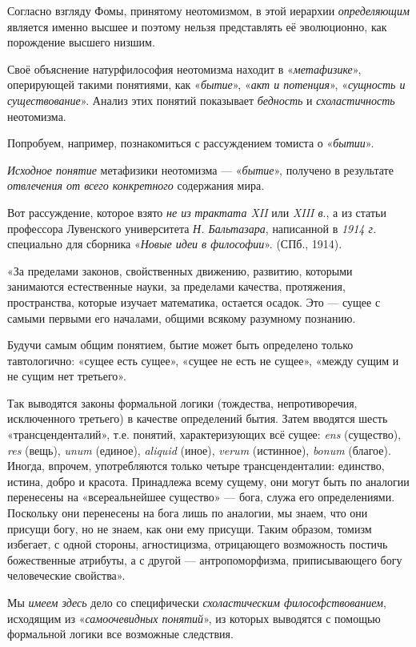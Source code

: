 \documentclass[a4paper,14pt,russian]{extreport}
\begin{document}
Согласно взгляду Фомы, принятому неотомизмом, в этой иерархии \emph{определяющим} является именно высшее и поэтому нельзя представлять её эволюционно, как порождение высшего низшим.

Своё объяснение натурфилософия неотомизма находит в «\emph{метафизике}», оперирующей такими понятиями, как «\emph{бытие}», «\emph{акт и потенция}», «\emph{сущность и существование}». Анализ этих понятий показывает \emph{бедность} и \emph{схоластичность} неотомизма.

Попробуем, например, познакомиться с рассуждением томиста о «\emph{бытии}».

\emph{Исходное понятие} метафизики неотомизма --- «\emph{бытие}», получено в результате \emph{отвлечения от всего конкретного} содержания мира.

Вот рассуждение, которое взято \emph{не из} \emph{трактата XII} или \emph{XIII в}., а из статьи профессора Лувенского университета \emph{Н. Бальтазара}, написанной в \emph{1914 г.} специально для сборника «\emph{Новые идеи в философии}». (СПб., 1914).

«За пределами законов, свойственных движению, развитию, которыми занимаются естественные науки, за пределами качества, протяжения, пространства, которые изучает математика, остается осадок. Это --- сущее с самыми первыми его началами, общими всякому разумному познанию.

Будучи самым общим понятием, бытие может быть определено только тавтологично: «сущее есть сущее», «сущее не есть не сущее», «между сущим и не сущим нет третьего».

Так выводятся законы формальной логики (тождества, непротиворечия, исключенного третьего) в качестве определений бытия. Затем вводятся шесть «трансценденталий», т.е. понятий, характеризующих всё сущее: \emph{ens} (существо), \emph{res} (вещь), \emph{unum} (единое), \emph{aliquid} (иное), \emph{verum} (истинное), \emph{bonum} (благое). Иногда, впрочем, употребляются только четыре трансценденталии: единство, истина, добро и красота. Принадлежа всему сущему, они могут быть по аналогии перенесены на «всереальнейшее существо» --- бога, служа его определениями. Поскольку они перенесены на бога лишь по аналогии, мы знаем, что они присущи богу, но не знаем, как они ему присущи. Таким образом, томизм избегает, с одной стороны, агностицизма, отрицающего возможность постичь божественные атрибуты, а с другой --- антропоморфизма, приписывающего богу человеческие свойства».

Мы \emph{имеем здесь} дело со специфически \emph{схоластическим философствованием}, исходящим из «\emph{самоочевидных понятий}», из которых выводятся с помощью формальной логики все возможные следствия.
\end{document}
